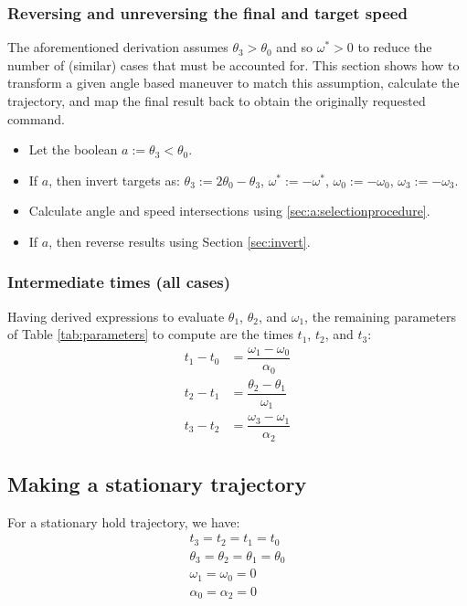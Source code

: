 \documentclass[12pt, a4paper]
{article}
\providecommand{\w}{\omega}
\providecommand{\wt}{\w^*}
\renewcommand{\th}{\theta}
\renewcommand{\a}{\alpha}
\begin{document}
\subsubsection{Reversing and unreversing the final and target speed}
\label{sec:a:reversing}
The aforementioned derivation assumes $\th_3 > \th_0$ and so $\wt > 0$ to
reduce the number of (similar) cases that must be accounted for. This section
shows how to transform a given angle based maneuver to match this assumption,
calculate the trajectory, and map the final result back to obtain the
originally requested command.

\begin{itemize}
    \item Let the boolean $a := \th_3 < \th_0$.
    \item If $a$, then invert targets as:
          $\th_3 := 2 \th_0 - \th_3$, $\wt := -\wt$, $\w_0 := -\w_0$,
          $\w_3 := -\w_3$.
    \item Calculate angle and speed intersections using
    \eqref{sec:a:selectionprocedure}.
    \item If $a$, then reverse results using Section \ref{sec:invert}.
\end{itemize}


\subsubsection{Intermediate times (all cases)}

Having derived expressions to evaluate $\th_1$, $\th_2$, and $\w_1$, the
remaining parameters of Table \ref{tab:parameters} to compute are the times
$t_1$, $t_2$, and $t_3$:
%
\begin{align}
    t_1 - t_0 &= \dfrac{\w_1-\w_0}{\a_0}\\[1em]
    t_2 - t_1 &= \dfrac{\th_2-\th_1}{\w_1}\\[1em]
    t_3 - t_2 &= \dfrac{\w_3-\w_1}{\a_2}
\end{align}

\subsection{Making a stationary trajectory}
\label{sec:stationary}
For a stationary hold trajectory, we have:
%
\begin{align}
    t_3 = t_2 = t_1 = t_0 \\[1em]
    \th_3 = \th_2 = \th_1 = \th_0 \\[1em]
    \w_1 = \w_0 = 0 \\[1em]
    \a_0 = \a_2 = 0
\end{align}
\end{document}

